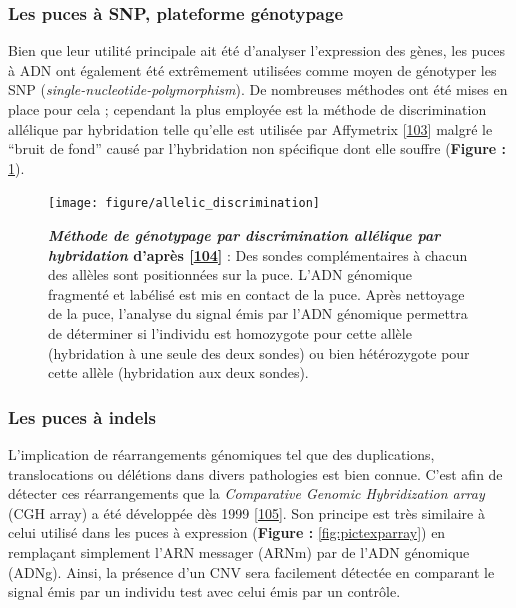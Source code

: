 \documentclass[12pt,a4paper,twoside]{ugathesis}
\theoremstyle{definition}
\theoremstyle{definition}
\theoremstyle{definition}
\theoremstyle{remark}
\begin{document}
\newpage

\subsubsection{Les puces à SNP, plateforme
génotypage}\label{les-puces-a-snp-plateforme-genotypage}

Bien que leur utilité principale ait été d'analyser l'expression des
gènes, les puces à ADN ont également été extrêmement utilisées comme
moyen de génotyper les SNP (\emph{single-nucleotide-polymorphism}). De
nombreuses méthodes ont été mises en place pour cela ; cependant la plus
employée est la méthode de discrimination allélique par hybridation
telle qu'elle est utilisée par Affymetrix
{[}\protect\hyperlink{ref-Wang1998}{103}{]} malgré le ``bruit de fond''
causé par l'hybridation non spécifique dont elle souffre (\textbf{Figure
:} \ref{fig:pictallelicdisc}).

\begin{figure}

{\centering \texttt{[image: figure/allelic\_discrimination]} 

}

\caption[Méthode de génotypage par discrimination allélique par hybridation]{\textbf{\emph{Méthode de génotypage par
discrimination allélique par hybridation} d'après
{[}\protect\hyperlink{ref-Bumgarner2013}{104}{]}} : Des sondes
complémentaires à chacun des allèles sont positionnées sur la puce.
L'ADN génomique fragmenté et labélisé est mis en contact de la puce.
Après nettoyage de la puce, l'analyse du signal émis par l'ADN génomique
permettra de déterminer si l'individu est homozygote pour cette allèle
(hybridation à une seule des deux sondes) ou bien hétérozygote pour
cette allèle (hybridation aux deux sondes).}\label{fig:pictallelicdisc}
\end{figure}











\newpage

\subsubsection{Les puces à indels}\label{les-puces-a-indels}

L'implication de réarrangements génomiques tel que des duplications,
translocations ou délétions dans divers pathologies est bien connue.
C'est afin de détecter ces réarrangements que la \emph{Comparative
Genomic Hybridization array} (CGH array) a été développée dès 1999
{[}\protect\hyperlink{ref-Brown1999}{105}{]}. Son principe est très
similaire à celui utilisé dans les puces à expression (\textbf{Figure :}
\ref{fig:pictexparray}) en remplaçant simplement l'ARN messager (ARNm)
par de l'ADN génomique (ADNg). Ainsi, la présence d'un CNV sera
facilement détectée en comparant le signal émis par un individu test
avec celui émis par un contrôle.
\end{document}
